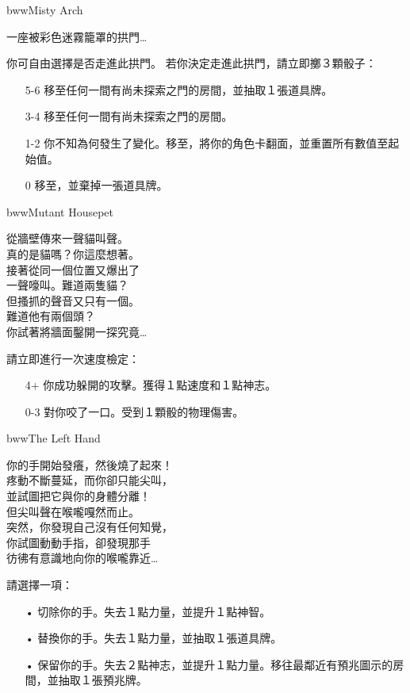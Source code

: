 \linebreak[0]%
\begin{EventCard}{bww}{Misty Arch}
  \begin{CardStory}
    一座被彩色迷霧籠罩的拱門…
  \end{CardStory}
  你可自由選擇是否走進此拱門。\smallbreak
  若你決定走進此拱門，請立即擲３顆骰子：
  \begin{itemize}
    \item[5-6] 移至任何一間有尚未探索之門的房間，並抽取１張道具牌。
    \item[3-4] 移至任何一間有尚未探索之門的房間。
    \item[1-2] 你不知為何發生了變化。移至，將你的角色卡翻面，並重置所有數值至起始值。
    \item[0] 移至，並棄掉一張道具牌。
  \end{itemize}
\end{EventCard}%
\linebreak[0]%
\begin{EventCard}{bww}{Mutant Housepet}
  \begin{CardStory}
    從牆壁傳來一聲貓叫聲。\\
    真的是貓嗎？你這麼想著。\\
    接著從同一個位置又爆出了\\
    一聲嚎叫。難道兩隻貓？\\
    但搔抓的聲音又只有一個。\\
    難道他有兩個頭？\\
    你試著將牆面鑿開一探究竟…
  \end{CardStory}
  請立即進行一次速度檢定：
  \begin{itemize}
    \item[4+] 你成功躲開\ThisName{}的攻擊。獲得１點速度和１點神志。
    \item[0-3] \ThisName{}對你咬了一口。受到１顆骰的物理傷害。
  \end{itemize}
\end{EventCard}%
\linebreak[0]%
\begin{EventCard}{bww}{The Left Hand}
  \begin{CardStory}
    你的手開始發癢，然後燒了起來！\\
    疼動不斷蔓延，而你卻只能尖叫，\\
    並試圖把它與你的身體分離！\\
    但尖叫聲在喉嚨嘎然而止。\\
    突然，你發現自己沒有任何知覺，\\
    你試圖動動手指，卻發現那手\\
    彷彿有意識地向你的喉嚨靠近…
  \end{CardStory}
  請選擇一項：
  \begin{itemize}
    \item[•] 切除你的手。失去１點力量，並提升１點神智。
    \item[•] 替換你的手。失去１點力量，並抽取１張道具牌。
    \item[•] 保留你的手。失去２點神志，並提升１點力量。移往最鄰近有預兆圖示的房間，並抽取１張預兆牌。
  \end{itemize}
\end{EventCard}%

